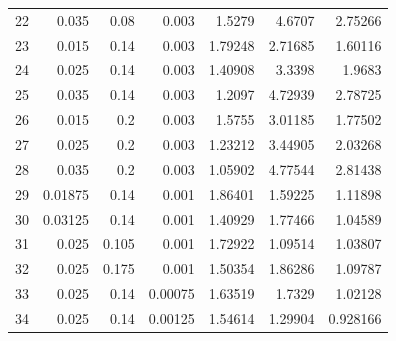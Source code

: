 {\begin{longtable}{@{}lrrrrrr@{}}
22 & 0.035 & 0.08 & 0.003 & 1.5279 & 4.6707 & 2.75266\\
23 & 0.015 & 0.14 & 0.003 & 1.79248 & 2.71685 & 1.60116\\
24 & 0.025 & 0.14 & 0.003 & 1.40908 & 3.3398 & 1.9683\\
25 & 0.035 & 0.14 & 0.003 & 1.2097 & 4.72939 & 2.78725\\
26 & 0.015 & 0.2 & 0.003 & 1.5755 & 3.01185 & 1.77502\\
27 & 0.025 & 0.2 & 0.003 & 1.23212 & 3.44905 & 2.03268\\
28 & 0.035 & 0.2 & 0.003 & 1.05902 & 4.77544 & 2.81438\\
29 & 0.01875 & 0.14 & 0.001 & 1.86401 & 1.59225 & 1.11898\\
30 & 0.03125 & 0.14 & 0.001 & 1.40929 & 1.77466 & 1.04589\\
31 & 0.025 & 0.105 & 0.001 & 1.72922 & 1.09514 & 1.03807\\
32 & 0.025 & 0.175 & 0.001 & 1.50354 & 1.86286 & 1.09787\\
33 & 0.025 & 0.14 & 0.00075 & 1.63519 & 1.7329 & 1.02128\\
34 & 0.025 & 0.14 & 0.00125 & 1.54614 & 1.29904 & 0.928166\\\end{longtable}}